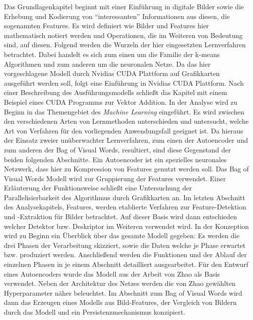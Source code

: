 Das Grundlagenkapitel beginnt mit einer Einführung in digitale Bilder sowie die Erhebung und Kodierung von \enquote{interessanten} Informationen aus diesen, die sogenannten Features. Es wird definiert wie Bilder und Features hier mathematisch notiert werden und Operationen, die im Weiteren von Bedeutung sind, auf diesen. Folgend werden die Wurzeln der hier eingesetzten Lernverfahren betrachtet. Dabei handelt es sich zum einen um die Familie der k-means Algorithmen und zum anderen um die neuronalen Netze. Da das hier vorgeschlagene Modell durch Nvidias CUDA Plattform auf Grafikkarten ausgeführt werden soll, folgt eine Einführung in Nvidias CUDA Plattform. Nach einer Beschreibung des Ausführungsmodells schließt das Kapitel mit einem Beispiel eines CUDA Programms zur Vektor Addition. \newline
In der Analyse wird zu Beginn in das Themengebiet des \textit{Machine Learning} eingeführt. Es wird zwischen den verschiedenen Arten von Lernmethoden unterschieden und untersucht, welche Art von Verfahren für den vorliegenden Anwendungsfall geeignet ist. Da hieraus der Einsatz zweier unüberwachter Lernverfahren, zum einen der Autoencoder und zum anderen der Bag of Visual Words, resultiert, sind diese Gegenstand der beiden folgenden Abschnitte. Ein Autoencoder ist ein spezielles neuronales Netzwerk, dass hier zu Kompression von Features genutzt werden soll. Das Bag of Visual Words Modell wird zur Gruppierung der Features verwendet. Einer Erläuterung der Funktionsweise schließt eine Untersuchung der Parallelisierbarkeit des Algorithmus durch Grafikkarten an. Im letzten Abschnitt des Analysekapitels, Features, werden etablierte Verfahren zur Feature-Detektion und -Extraktion für Bilder betrachtet. Auf dieser Basis wird dann entschieden welcher Detektor bzw. Deskriptor im Weiteren verwendet wird. \newline
In der Konzeption wird zu Beginn ein Überblick über das gesamte Modell gegeben: Es werden die drei Phasen der Verarbeitung skizziert, sowie die Daten welche je Phase erwartet bzw. produziert werden. Anschließend werden die Funktionen und der Ablauf der einzelnen Phasen in je einem Abschnitt detailliert ausgearbeitet. Für den Entwurf eines Autoencoders wurde das Modell aus der Arbeit von Zhao \cite{aed2016} als Basis verwendet. Neben der Architektur des Netzes werden die von Zhao gewählten Hyperparameter näher beleuchtet. Im Abschnitt zum Bag of Visual Words wird dann das Erzeugen eines Modells aus Bild-Features, der Vergleich von Bildern durch das Modell und ein Persistenzmechanismus konzipiert. \newline
